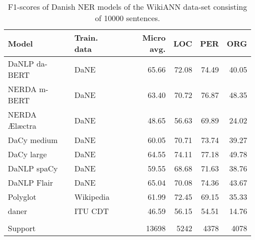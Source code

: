 \documentclass[main.tex]{subfiles}
\begin{document}
\begin{table}
        \begin{center}
                \begin{tabular}{l l r r r r}
                        Model & Train. data & Micro avg. & LOC & PER & ORG \\
                        \hline
                        DaNLP da-BERT & DaNE & 65.66 & 72.08 & 74.49 & 40.05 \\
                        NERDA m-BERT & DaNE & 63.40 & 70.72 & 76.87 & 48.35 \\
                        NERDA Ælæctra & DaNE & 48.65 & 56.63 & 69.89 & 24.02 \\
                        DaCy medium & DaNE & 60.05 & 70.71 & 73.74 & 39.27 \\
                        DaCy large & DaNE & 64.55 & 74.11 & 77.18 & 49.78 \\
                        DaNLP spaCy & DaNE & 59.55 & 68.68 & 71.63 & 38.76 \\
                        DaNLP Flair & DaNE & 65.04 & 70.08 & 74.36 & 43.67 \\
                        Polyglot & Wikipedia & 61.99 & 72.45 & 69.15 & 35.33 \\
                        daner & ITU CDT & 46.59 & 56.15 & 54.51 & 14.76 \\
                         &  &  &  &  &  \\
                        Support &  & 13698 & 5242 & 4378 & 4078 \\
                \end{tabular}
        \end{center}
        \caption{F1\pro-scores of Danish NER models of the WikiANN data-set consisting of 10000 sentences.}
        \label{tab:WikiANN}
\end{table}
\end{document}
